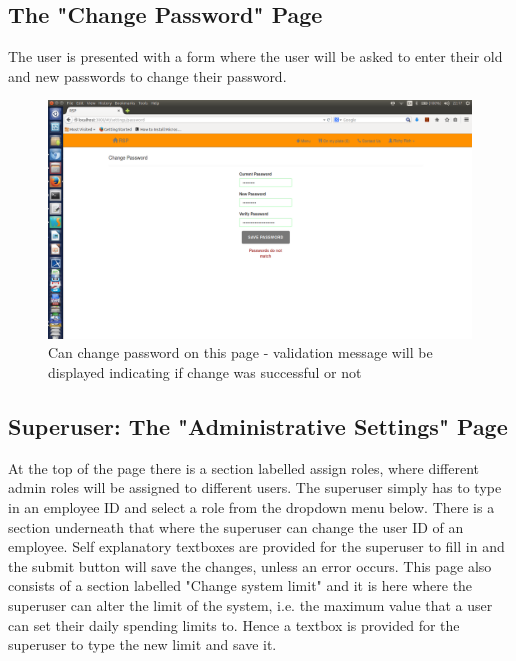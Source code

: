 \documentclass[a4paper,12pt]{article}
\begin{document}
\subsection{The "Change Password" Page} 
The user is presented with a form where the user will be asked to enter their old and new passwords to change their password. 

\begin{figure}[H]
  \centering
    \includegraphics[width=1.0\textwidth]{screenshots/changePassDontMatch.png}
    \caption{Can change password on this page - validation message will be displayed indicating if change was successful or not} 
\end{figure}

\subsection{Superuser: The "Administrative Settings" Page} 
At the top of the page there is a section labelled assign roles, where different admin roles will be assigned to different users. The superuser simply has to type in an employee ID and select a role from the dropdown menu below. There is a section underneath that where the superuser can change the user ID of an employee. Self explanatory textboxes are provided for the superuser to fill in and the submit button will save the changes, unless an error occurs.  This page also consists of a section labelled "Change system limit" and it is here where the superuser can alter the limit of the system, i.e. the maximum value that a user can set their daily spending limits to. Hence a textbox is provided for the superuser to type the new limit and save it.
\end{document}
